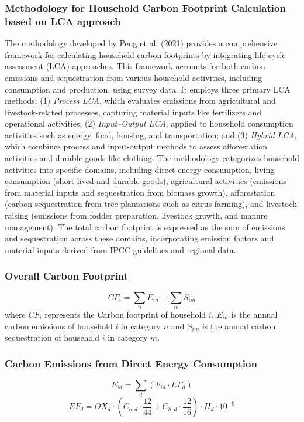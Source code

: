\documentclass[12pt,a4paper]{article}
\begin{document}
\subsubsection{Methodology for Household Carbon Footprint Calculation based on LCA approach}

The methodology developed by Peng et al. (2021) provides a comprehensive framework for calculating household carbon footprints by integrating life-cycle assessment (LCA) approaches. This framework accounts for both carbon emissions and sequestration from various household activities, including consumption and production, using survey data. It employs three primary LCA methods: (1) \textit{Process LCA}, which evaluates emissions from agricultural and livestock-related processes, capturing material inputs like fertilizers and operational activities; (2) \textit{Input–Output LCA}, applied to household consumption activities such as energy, food, housing, and transportation; and (3) \textit{Hybrid LCA}, which combines process and input-output methods to assess afforestation activities and durable goods like clothing. The methodology categorizes household activities into specific domains, including direct energy consumption, living consumption (short-lived and durable goods), agricultural activities (emissions from material inputs and sequestration from biomass growth), afforestation (carbon sequestration from tree plantations such as citrus farming), and livestock raising (emissions from fodder preparation, livestock growth, and manure management). The total carbon footprint is expressed as the sum of emissions and sequestration across these domains, incorporating emission factors and material inputs derived from IPCC guidelines and regional data. 
\subsubsection*{Overall Carbon Footprint}
\begin{equation}
CF_i = \sum_{n} E_{in} + \sum_{m} S_{im}
\end{equation}
where $CF_i$ represents the Carbon footprint of household $i$, $E_{in}$ is the annual carbon emissions of household $i$ in category $n$ and $S_{im}$ is the annual carbon sequestration of household $i$ in category $m$.


\subsubsection*{Carbon Emissions from Direct Energy Consumption}
\begin{equation}
E_{id} = \sum_d (F_{id} \cdot EF_d)
\end{equation}
\begin{equation}
EF_d = OX_d \cdot \left(C_{o,d} \cdot \frac{12}{44} + C_{h,d} \cdot \frac{12}{16}\right) \cdot H_d \cdot 10^{-9}
\end{equation}
\end{document}

